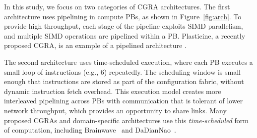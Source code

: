 In this study, we focus on two categories of CGRA architectures.
The first architecture uses pipelining in compute PBs, as shown in Figure~\ref{fig:arch}.
To provide high throughput, each stage of the pipeline exploits SIMD parallelism, and multiple SIMD operations are pipelined within a PB.
Plasticine, a recently proposed CGRA, is an example of a pipelined architecture \cite{plasticine}.

The second architecture uses time-scheduled execution, where each PB executes a small loop of instructions (e.g., 6) repeatedly. 
The scheduling window is small enough that instructions are stored as part of the configuration fabric, without dynamic instruction fetch overhead. 
This execution model creates more interleaved pipelining across PBs with communication that is tolerant of lower network throughput, which provides an opportunity to share links.
Many proposed CGRAs and domain-specific architectures use this \emph{time-scheduled} form of computation, including Brainwave~\cite{brainwave} and DaDianNao~\cite{dadiannao}.

